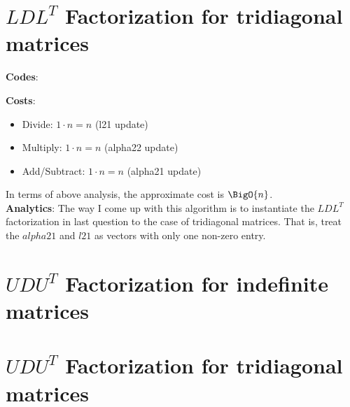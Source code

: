 \documentclass[11pt,a4paper]{article}
\begin{document}
\section{$LDL^T$ Factorization for tridiagonal matrices}
\textbf{Codes}:


\noindent
\textbf{Costs}: 
\begin{itemize}
    \item Divide: $ 1 \cdot n = n$ (l21 update)  
    \item Multiply: $1 \cdot n = n$ (alpha22 update)
    \item Add/Subtract: $1 \cdot n = n$ (alpha21 update) 
\end{itemize}
In terms of above analysis, the approximate cost is $\BigO{n}$. \\

\noindent
\textbf{Analytics}: 
    The way I come up with this algorithm is to instantiate the $LDL^T$
    factorization in last question to the case of tridiagonal matrices. That
    is, treat the $alpha21$ and $l21$ as vectors with only one non-zero entry.

\newpage
\section{$UDU^T$ Factorization for indefinite matrices}


\newpage
\section{$UDU^T$ Factorization for tridiagonal matrices}


\newpage
\end{document}
